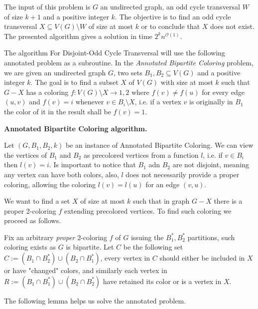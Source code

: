 The input of this problem is $G$ an undirected graph, an odd cycle transversal $W$ of size $k+1$ and a positive integer $k$.
The objective is to find an odd cycle transversal $X \subseteq V(G) \setminus W$ of size at most $k$ or to conclude that $X$ does not exist.
The presented algorithm gives a solution in time $2^{k}n^{\mathcal{O}(1)}$.

The algorithm For Disjoint-Odd Cycle Transversal will use the following annotated problem as a subroutine.
In the \emph{Annotated Bipartite Coloring} problem, we are given an undirected graph $G$, two sets $B_1,B_2 \subseteq V(G)$ and a positive integer $k$.
The goal is to find a subset $X$ of $V(G)$ with size at most $k$ such that $G-X$ has a coloring $f : V(G) \setminus X \rightarrow {1,2}$ where $f(v) \neq f(u)$ for every edge $(u,v)$
and $f(v) = i$ whenever $v \in B_i \setminus X$, i.e. if a vertex $v$ is originally in $B_1$ the color of it in the result shall be $f(v)=1$.

\textbf{Annotated Bipartite Coloring algorithm.}

Let $(G,B_1,B_2,k)$ be an instance of Annotated Bipartite Coloring.
We can view the vertices of $B_1$ and $B_2$ as precolored vertices from a function $l$, i.e. if $v \in B_i$ then $l(v)=i$.
Is important to notice that $B_1$ adn $B_2$ are not disjoint, meaning any vertex can have both colors, also, $l$ does not necessarily provide a proper coloring,
allowing the coloring $l(v)=l(u)$ for an edge $(v,u)$.

We want to find a set $X$ of size at most $k$ such that in graph $G-X$ there is a proper 2-coloring $f$ extending precolored vertices.
To find such coloring we proceed as follows.

Fix an arbitrary \emph{proper} 2-coloring $f$ of $G$ issuing the $B_1^*,B_2^*$ partitions, such coloring exists as $G$ is bipartite.
Let $C$ be the following set $C := (B_1 \cap B_2^*) \cup (B_2 \cap B_1^*)$, every vertex in $C$ should either be included in $X$ or have "changed" colors,
and similarly each vertex in $R := (B_1 \cap B_1^*) \cup (B_2 \cap B_2^*)$ have retained its color or is a vertex in $X$.

The following lemma helps us solve the annotated problem.

